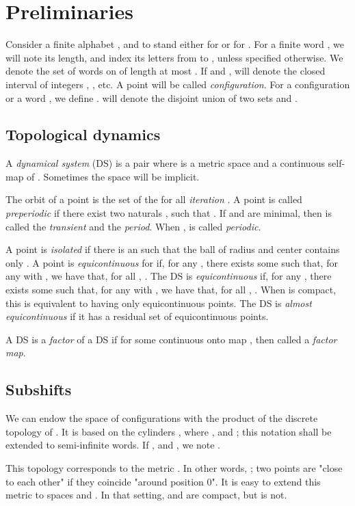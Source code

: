\documentclass{llncs}
\newcommand{\xpr}[1]{"#1"}
\begin{document}
\section{Preliminaries}
Consider a finite alphabet , and  to stand either for  or for .
For a finite word , we will note  its length, and index its letters from  to , unless specified otherwise.
We denote  the set of words on  of length at most .
If  and ,  will denote the closed interval of integers , , etc.
A point  will be called \emph{configuration}.
For a configuration or a word , we define .
 will denote the disjoint union of two sets  and .
\subsection{Topological dynamics}\label{sec:top}
A \emph{dynamical system} (DS) is a pair  where  is a metric space and  a continuous self-map of . Sometimes the space will be implicit.

The orbit of a point  is the set of the  for all \emph{iteration} .
A point  is called \emph{preperiodic} if there exist two naturals ,  such that .
If  and  are minimal, then  is called the \emph{transient} and  the \emph{period}.
When ,  is called \emph{periodic}.


A point  is \emph{isolated} if there is an  such that the ball of radius  and center  contains only .
A point  is \emph{equicontinuous} for  if, for any , there exists some  such that, for any  with , we have that, for all , .
The DS  is \emph{equicontinuous} if, for any , there exists some  such that, for any  with , we have that, for all , .
When  is compact, this is equivalent to having only equicontinuous points.
The DS  is \emph{almost equicontinuous} if it has a residual set of equicontinuous points.

A DS  is a \emph{factor} of a DS  if  for some continuous onto map , then called a \emph{factor map}.
\subsection{Subshifts}
We can endow the space  of {configurations} with the product of the discrete topology of .
It is based on the cylinders , where ,  and ; this notation shall be extended to semi-infinite words.
If ,  and , we note .

This topology corresponds to the metric .
In other words, ; two points are \xpr{close to each other} if they coincide \xpr{around position 0}.
It is easy to extend this metric to spaces  and .
In that setting,  and  are compact, but  is not.
\end{document}

